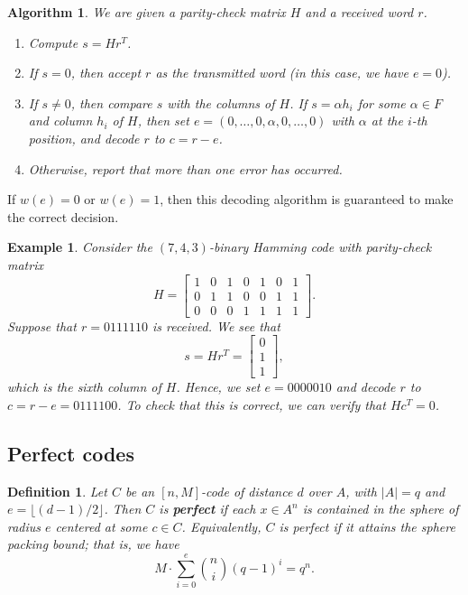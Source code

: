 \documentclass[10pt]{article}
\theoremstyle{newstyle}
\newtheorem{defn}[thm]{Definition}
\newtheorem{exmp}[thm]{Example}
\newtheorem{algo}[thm]{Algorithm}
\begin{document}
\begin{algo}
We are given a parity-check matrix $H$ and a received word $r$. 
\begin{enumerate}[(1)]
    \item Compute $s = Hr^T$. 
    \item If $s = 0$, then accept $r$ as the transmitted word (in this case, we have $e = 0$). 
    \item If $s \neq 0$, then compare $s$ with the columns of $H$. If $s = \alpha h_i$ for some 
    $\alpha \in F$ and column $h_i$ of $H$, then set $e = (0, \dots, 0, \alpha, 0, \dots, 0)$
    with $\alpha$ at the $i$-th position, and decode $r$ to $c = r-e$. 
    \item Otherwise, report that more than one error has occurred. 
\end{enumerate}
\end{algo}
If $w(e) = 0$ or $w(e) = 1$, then this decoding algorithm is guaranteed to make the correct decision. 

\begin{exmp}
Consider the $(7, 4, 3)$-binary Hamming code with parity-check matrix 
\[ H = \begin{bmatrix} 
1 & 0 & 1 & 0 & 1 & 0 & 1 \\ 0 & 1 & 1 & 0 & 0 & 1 & 1 \\ 0 & 0 & 0 & 1 & 1 & 1 & 1 \end{bmatrix}. \]
Suppose that $r = 0111110$ is received. We see that 
\[ s = Hr^T = \begin{bmatrix} 0 \\ 1 \\ 1 \end{bmatrix}, \]
which is the sixth column of $H$. Hence, we set $e = 0000010$ and decode $r$ to $c = 
r-e = 0111100$. To check that this is correct, we can verify that $Hc^T = 0$. 
\end{exmp}

\subsection{Perfect codes}

\begin{defn}
Let $C$ be an $[n, M]$-code of distance $d$ over $A$, with $|A| = q$ and $e = \lfloor (d-1)/2 \rfloor$. 
Then $C$ is {\bf perfect} if each $x \in A^n$ is contained in the sphere of radius $e$ centered 
at some $c \in C$. Equivalently, $C$ is perfect if it attains the sphere packing bound; that is, 
we have 
\[ M \cdot \sum_{i=0}^e \binom{n}{i} (q-1)^i = q^n. \]
\end{defn}
\end{document}
